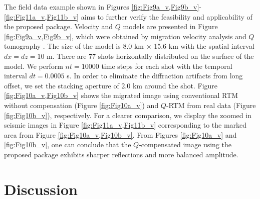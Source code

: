 The field data example shown in Figures \ref{fig:Fig9a_v,Fig9b_v}-\ref{fig:Fig11a_v,Fig11b_v} aims to further verify the feasibility and applicability of the proposed package. Velocity and $Q$ models are presented in Figure \ref{fig:Fig9a_v,Fig9b_v}, which were obtained by migration velocity analysis \citep{sava2008numeric} and $Q$ tomography \citep{shen2015image}. The size of the model is 8.0 km $\times$ 15.6 km with the spatial interval $dx = dz = 10$ m. There are 77 shots horizontally distributed on the surface of the model. We perform $nt = 10000$ time steps for each shot with the temporal interval $dt = 0.0005$ s. In order to eliminate the diffraction artifacts from long offset, we set the stacking aperture of 2.0 km around the shot. Figure \ref{fig:Fig10a_v,Fig10b_v} shows the migrated image using conventional RTM without compensation (Figure \ref{fig:Fig10a_v}) and $Q$-RTM from real data (Figure \ref{fig:Fig10b_v}), respectively. For a clearer comparison, we display the zoomed in seismic images in Figure \ref{fig:Fig11a_v,Fig11b_v} corresponding to the marked area from Figure \ref{fig:Fig10a_v,Fig10b_v}. From Figures \ref{fig:Fig10a_v} and \ref{fig:Fig10b_v}, one can conclude that the $Q$-compensated image using the proposed package exhibits sharper reflections and more balanced amplitude. 







\section{Discussion}

